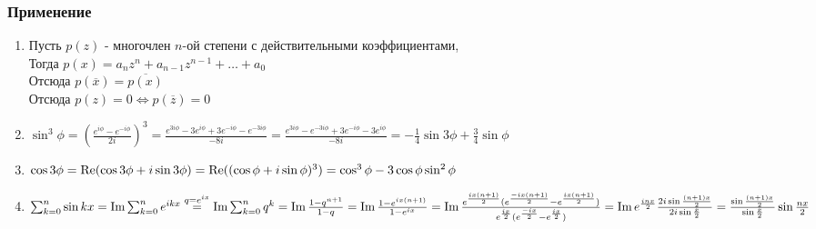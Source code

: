 \documentclass[12pt]{article}
\begin{document}
\subsubsection{Применение}
\begin{enumerate}
    \item Пусть $p(z)$ - многочлен $n$-ой степени с действительными коэффициентами,\\
    Тогда $p(x) = a_nz^n+a_{n-1}z^{n-1} + \ldots + a_0$\\
    Отсюда $p(\overline{x}) = \overline{p(x)}$\\
    Отсюда $p(z) = 0 \Leftrightarrow p(\overline{z}) = 0$
    \item $\sin^3 \phi = \left(\frac{e^{i\phi}-e^{-i\phi}}{2i}\right)^3 = \frac{e^{3i\phi}-3e^{i\phi}+3e^{-i\phi}-e^{-3i\phi}}{-8i} = \frac{e^{3i\phi}-e^{-3i\phi}+3e^{-i\phi}-3e^{i\phi}}{-8i} = -\frac14 \sin 3\phi + \frac34 \sin \phi$
    \item $\cos 3\phi = \operatorname{Re}(\cos 3\phi + i\sin 3\phi) = \operatorname{Re}((\cos \phi + i\sin\phi)^3) =\cos^3 \phi - 3\cos\phi\sin^2\phi$
    \item $\sum_{k=0}^n \sin kx = \operatorname{Im} \sum_{k=0}^n e^{ikx} \overset{q=e^{ix}}= \operatorname{Im} \sum_{k=0}^n q^k = \operatorname{Im} \frac{1-q^{n+1}}{1-q} = \operatorname{Im} \frac{1-e^{ix(n+1)}}{1-e^{ix}} = \operatorname{Im} \frac{e^\frac{ix(n+1)}{2}(e^\frac{-ix(n+1)}{2}-e^\frac{ix(n+1)}{2})}{e^\frac{ix}{2}(e^\frac{-ix}{2}-e^\frac{ix}{2})} = \operatorname{Im} e^{\frac{inx}{2}}\frac{2i\sin\frac{(n+1)x}{2}}{2i\sin \frac x2} = \frac{\sin \frac{(n+1)x}{2}}{\sin \frac x2}\sin \frac{nx}{2}$
\end{enumerate}
\end{document}
